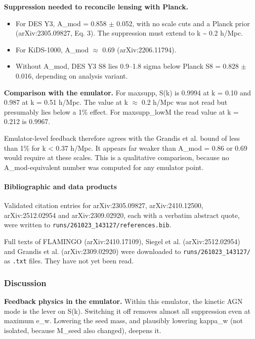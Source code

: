 \documentclass[11pt,a4paper]{article}
\begin{document}
\textbf{Suppression needed to reconcile lensing with Planck.}

\begin{itemize}
  \item For DES Y3, A\_mod = 0.858 $\pm$ 0.052, with no scale cuts and a Planck prior (arXiv:2305.09827, Eq. 3). The suppression must extend to k \textasciitilde{} 0.2 h/Mpc.
  \item For KiDS-1000, A\_mod $\approx$ 0.69 (arXiv:2206.11794).
  \item Without A\_mod, DES Y3 S8 lies 0.9--1.8 sigma below Planck S8 = 0.828 $\pm$ 0.016, depending on analysis variant.
\end{itemize}
\textbf{Comparison with the emulator.} For maxsupp, S(k) is 0.9994 at k = 0.10 and 0.987 at k = 0.51 h/Mpc. The value at k $\approx$ 0.2 h/Mpc was not read but presumably lies below a 1\% effect. For maxsupp\_lowM the read value at k = 0.212 is 0.9967.

Emulator-level feedback therefore agrees with the Grandis et al. bound of less than 1\% for k \textless{} 0.37 h/Mpc. It appears far weaker than A\_mod = 0.86 or 0.69 would require at these scales. This is a qualitative comparison, because no A\_mod-equivalent number was computed for any emulator point.

\paragraph{Bibliographic and data products}
Validated citation entries for arXiv:2305.09827, arXiv:2410.12500, arXiv:2512.02954 and arXiv:2309.02920, each with a verbatim abstract quote, were written to \texttt{runs/\allowbreak{}261023\_\allowbreak{}143127/\allowbreak{}references.bib}.

Full texts of FLAMINGO (arXiv:2410.17109), Siegel et al. (arXiv:2512.02954) and Grandis et al. (arXiv:2309.02920) were downloaded to \texttt{runs/\allowbreak{}261023\_\allowbreak{}143127/\allowbreak{}} as \texttt{.txt} files. They have not yet been read.

\subsubsection*{Discussion}
\textbf{Feedback physics in the emulator.} Within this emulator, the kinetic AGN mode is the lever on S(k). Switching it off removes almost all suppression even at maximum e\_w. Lowering the seed mass, and plausibly lowering kappa\_w (not isolated, because M\_seed also changed), deepens it.
\end{document}
